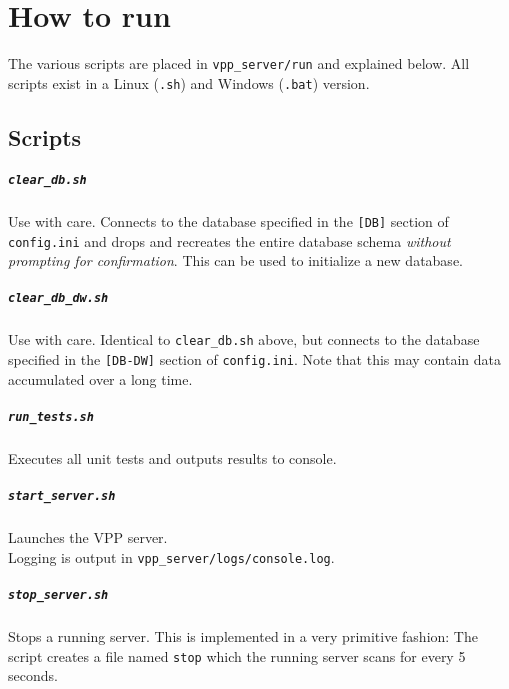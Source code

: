 


\chapter{How to run} \label{ch:how_to_run}
The various scripts are placed in \texttt{vpp\_server/run} and explained below. All scripts exist in a Linux (\texttt{.sh}) and Windows (\texttt{.bat}) version.

\section{Scripts}

\paragraph{\texttt{clear\_db.sh}}
Use with care. Connects to the database specified in the \texttt{[DB]} section of \texttt{config.ini} and drops and recreates the entire database schema \emph{without prompting for confirmation}. This can be used to initialize a new database.

\paragraph{\texttt{clear\_db\_dw.sh}}
Use with care. Identical to \texttt{clear\_db.sh} above, but connects to the database specified in the \texttt{[DB-DW]} section of \texttt{config.ini}. Note that this may contain data accumulated over a long time.


\paragraph{\texttt{run\_tests.sh}}
Executes all unit tests and outputs results to console.

\paragraph{\texttt{start\_server.sh}}
Launches the VPP server. \\
Logging is output in \texttt{vpp\_server/logs/console.log}.


\paragraph{\texttt{stop\_server.sh}}
Stops a running server. 
This is implemented in a very primitive fashion: The script creates a file named \texttt{stop} which the running server scans for every 5 seconds. 